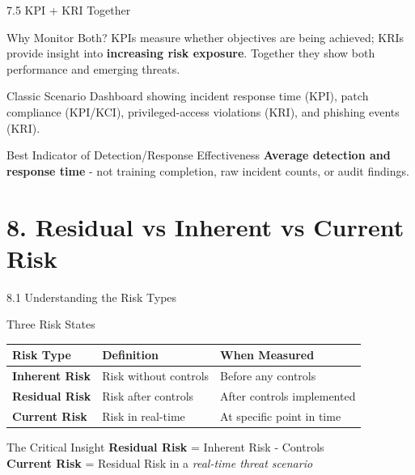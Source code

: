 \documentclass{beamer}
\begin{document}
	\begin{frame}{7.5 KPI + KRI Together}
		\begin{block}{Why Monitor Both?}
			KPIs measure whether objectives are being achieved; KRIs provide insight into \textbf{increasing risk exposure}. Together they show both performance and emerging threats.
		\end{block}
		
		\begin{alertblock}{Classic Scenario}
			Dashboard showing incident response time (KPI), patch compliance (KPI/KCI), privileged-access violations (KRI), and phishing events (KRI).
		\end{alertblock}
		
		\begin{exampleblock}{Best Indicator of Detection/Response Effectiveness}
			\textbf{Average detection and response time} - not training completion, raw incident counts, or audit findings.
		\end{exampleblock}
	\end{frame}
	
	\section{8. Residual vs Inherent vs Current Risk}
	
	\begin{frame}{8.1 Understanding the Risk Types}
		\begin{block}{Three Risk States}
			\begin{tabular}{|p{2.5cm}|p{4cm}|p{4.5cm}|}
				\hline
				\textbf{Risk Type} & \textbf{Definition} & \textbf{When Measured} \\
				\hline
				\textbf{Inherent Risk} & Risk without controls & Before any controls \\
				\hline
				\textbf{Residual Risk} & Risk after controls & After controls implemented \\
				\hline
				\textbf{Current Risk} & Risk in real-time & At specific point in time \\
				\hline
			\end{tabular}
		\end{block}
		
		\begin{alertblock}{The Critical Insight}
			\textbf{Residual Risk} = Inherent Risk - Controls \\
			\textbf{Current Risk} = Residual Risk in a \textit{real-time threat scenario}
		\end{alertblock}
	\end{frame}
	
\end{document}
